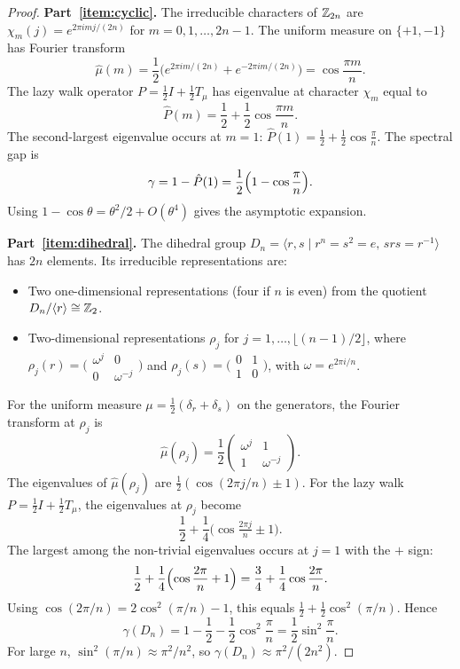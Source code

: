\begin{proof}
\textbf{Part~\ref{item:cyclic}.}
The irreducible characters of $\mathbb{Z}_{2n}$ are
$\chi_m(j) = e^{2\pi i mj/(2n)}$ for $m = 0, 1, \ldots, 2n-1$.
The uniform measure on $\{+1, -1\}$ has Fourier transform
\[
  \hat{\mu}(m) = \frac{1}{2}\bigl(e^{2\pi im/(2n)} + e^{-2\pi im/(2n)}\bigr)
  = \cos\frac{\pi m}{n}.
\]
The lazy walk operator $P = \frac{1}{2}I + \frac{1}{2}T_\mu$ has
eigenvalue at character $\chi_m$ equal to
\[
  \hat{P}(m)
  = \frac{1}{2} + \frac{1}{2}\cos\frac{\pi m}{n}.
\]
The second-largest eigenvalue occurs at $m = 1$:
$\hat{P}(1) = \frac{1}{2} + \frac{1}{2}\cos\frac{\pi}{n}$.
The spectral gap is
\[
  \gamma = 1 - \hat{P}(1)
  = \frac{1}{2}\Bigl(1 - \cos\frac{\pi}{n}\Bigr).
\]
Using $1 - \cos\theta = \theta^2/2 + O(\theta^4)$ gives the
asymptotic expansion.

\medskip
\noindent\textbf{Part~\ref{item:dihedral}.}
The dihedral group $D_n = \langle r, s \mid r^n = s^2 = e,\,
srs = r^{-1}\rangle$ has $2n$ elements.  Its irreducible
representations are:
\begin{itemize}[itemsep=1pt]
\item Two one-dimensional representations (four if $n$ is even)
  from the quotient $D_n / \langle r \rangle \cong \mathbb{Z}_2$.
\item Two-dimensional representations $\rho_j$ for
  $j = 1, \ldots, \lfloor(n-1)/2\rfloor$, where
  $\rho_j(r) = \bigl(\begin{smallmatrix} \omega^j & 0 \\
  0 & \omega^{-j} \end{smallmatrix}\bigr)$
  and $\rho_j(s) = \bigl(\begin{smallmatrix} 0 & 1 \\
  1 & 0 \end{smallmatrix}\bigr)$, with $\omega = e^{2\pi i/n}$.
\end{itemize}

For the uniform measure $\mu = \frac{1}{2}(\delta_r + \delta_s)$
on the generators, the Fourier transform at $\rho_j$ is
\[
  \hat{\mu}(\rho_j)
  = \frac{1}{2}\begin{pmatrix} \omega^j & 1 \\ 1 & \omega^{-j}
  \end{pmatrix}.
\]
The eigenvalues of $\hat{\mu}(\rho_j)$ are
$\frac{1}{2}(\cos(2\pi j/n) \pm 1)$.
For the lazy walk $P = \frac{1}{2}I + \frac{1}{2}T_\mu$, the
eigenvalues at $\rho_j$ become
\[
  \frac{1}{2} + \frac{1}{4}\bigl(\cos\tfrac{2\pi j}{n} \pm 1\bigr).
\]
The largest among the non-trivial eigenvalues occurs at $j = 1$
with the $+$ sign:
\[
  \frac{1}{2} + \frac{1}{4}\Bigl(\cos\frac{2\pi}{n} + 1\Bigr)
  = \frac{3}{4} + \frac{1}{4}\cos\frac{2\pi}{n}.
\]
Using $\cos(2\pi/n) = 2\cos^2(\pi/n) - 1$, this equals
$\frac{1}{2} + \frac{1}{2}\cos^2(\pi/n)$.  Hence
\[
  \gamma(D_n)
  = 1 - \frac{1}{2} - \frac{1}{2}\cos^2\frac{\pi}{n}
  = \frac{1}{2}\sin^2\frac{\pi}{n}.
\]
For large $n$, $\sin^2(\pi/n) \approx \pi^2/n^2$, so
$\gamma(D_n) \approx \pi^2/(2n^2)$.


\end{proof}
